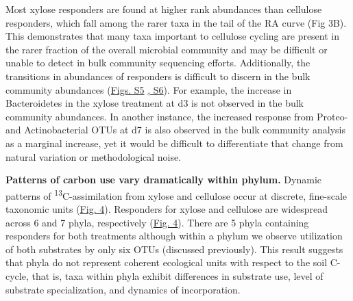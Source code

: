Most xylose responders are found at higher rank abundances than cellulose responders, which fall among the rarer taxa in the tail of the RA curve (Fig 3B). This demonstrates that many taxa important to cellulose cycling are present in the rarer fraction of the overall microbial community and may be difficult or unable to detect in bulk community sequencing efforts. Additionally, the transitions in abundances of responders is difficult to discern in the bulk community abundances (\href{https://authorea.com/users/3537/articles/8459/master/file/figures/xylose_resp_profiles/xylose_resp_profiles.png}{Figs. S5} \href{https://authorea.com/users/3537/articles/8459/master/file/figures/cellulose_resp_profiles/cellulose_resp_profiles.png}{, S6}). For example, the increase in Bacteroidetes in the xylose treatment at d3 is not observed in the bulk community abundances. In another instance, the increased response from Proteo- and Actinobacterial OTUs at d7 is also observed in the bulk community analysis as a marginal increase, yet it would be difficult to differentiate that change from natural variation or methodological noise.



\textbf{Patterns of carbon use vary dramatically within phylum.} Dynamic patterns of \textsuperscript{13}C-assimilation from xylose and cellulose occur at discrete, fine-scale taxonomic units (\href{https://authorea.com/users/3537/articles/3612/master/file/figures/bacteria_tree/bacteria_tree.png}{Fig. 4}). Responders for xylose and cellulose are widespread across 6 and 7 phyla, respectively (\href{https://authorea.com/users/3537/articles/3612/master/file/figures/bacteria_tree/bacteria_tree.png}{Fig. 4}). There are 5 phyla containing responders for both treatments although within a phylum we observe utilization of both substrates by only six OTUs (discussed previously). This result suggests that phyla do not represent coherent ecological units with respect to the soil C-cycle, that is, taxa within phyla exhibit differences in substrate use, level of substrate specialization, and dynamics of incorporation. 

